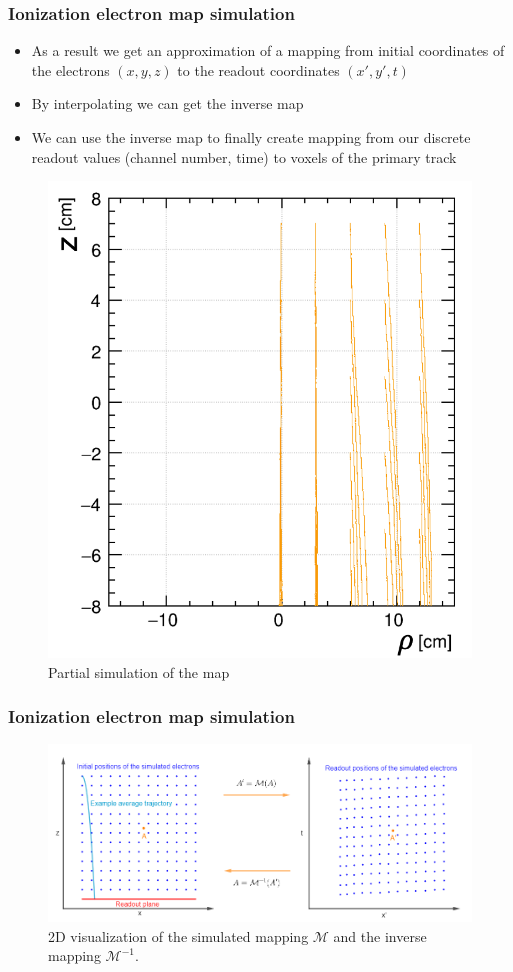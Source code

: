 \documentclass{beamer}
\begin{document}
	\begin{frame}
		\frametitle{Ionization electron map simulation}
		\begin{itemize}
			\item As a result we get an approximation of a mapping from initial coordinates of the electrons $(x,y,z)$ to the readout coordinates $(x',y',t)$
			\item By interpolating we can get the inverse map
			\item We can use the inverse map to finally create mapping from our discrete readout values (channel number, time) to voxels of the primary track
		\end{itemize}
		\begin{figure}
			\centering
			\includegraphics[height=0.4\textheight]{../images/map_lines.png}\\
			\small{Partial simulation of the map}
		\end{figure}
	\end{frame}
	\begin{frame}
		\frametitle{Ionization electron map simulation}
		\begin{figure}
			\centering
			\includegraphics[width=\textwidth]{../images/map_visualization.png}
			\small{2D visualization of the simulated mapping $\mathcal{M}$ and the inverse mapping $\mathcal{M}^{-1}$.}
		\end{figure}
	\end{frame}
\end{document}
